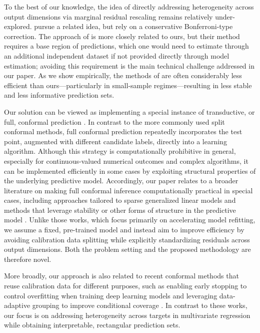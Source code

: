 To the best of our knowledge, the idea of directly addressing heterogeneity across output dimensions via marginal residual rescaling remains relatively under-explored. \citet{baheri2025multiscale} pursue a related idea, but rely on a conservative Bonferroni-type correction. {\color{blue}The approach of \citet{sampson2024conformal} is more closely related to ours, but their method requires a base region of predictions, which one would need to estimate through an additional independent dataset if not provided directly through model estimation; avoiding this requirement is the main technical challenge addressed in our paper. As we show empirically, the methods of \citet{sampson2024conformal} are often considerably less efficient than ours—particularly in small-sample regimes—resulting in less stable and less informative prediction sets.}

Our solution can be viewed as implementing a special instance of transductive, or full, conformal prediction \citep{vovk2005algorithmic,vovk2013transductive}. In contrast to the more commonly used split conformal methods, full conformal prediction repeatedly incorporates the test point, augmented with different candidate labels, directly into a learning algorithm. Although this strategy is computationally prohibitive in general, especially for continuous-valued numerical outcomes and complex algorithms, it can be implemented efficiently in some cases by exploiting structural properties of the underlying predictive model. Accordingly, our paper relates to a broader literature on making full conformal inference computationally practical in special cases, including approaches tailored to sparse generalized linear models \citep{lei2019fast,guha2023conformalization} and methods that leverage stability or other forms of structure in the predictive model \citep{ndiaye2019computing, abad2022approximating, martinez2023approximating, li2024generalized}. Unlike those works, which focus primarily on accelerating model refitting, we assume a fixed, pre-trained model and instead aim to improve efficiency by avoiding calibration data splitting while explicitly standardizing residuals across output dimensions. Both the problem setting and the proposed methodology are therefore novel.

More broadly, our approach is also related to recent conformal methods that reuse calibration data for different purposes, such as enabling early stopping to control overfitting when training deep learning models \citep{liang2023conformal} and leveraging data-adaptive grouping to improve conditional coverage \citep{zhou2024conformal, zhang2024posterior}. In contrast to these works, our focus is on addressing heterogeneity across targets in multivariate regression while obtaining interpretable, rectangular prediction sets.


